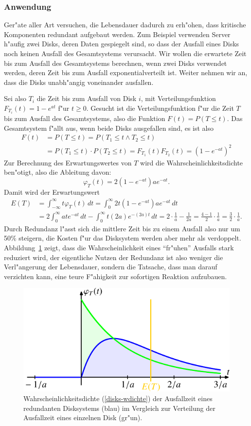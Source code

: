 \subsubsection{Anwendung}
Ger"ate aller Art versuchen, die Lebensdauer dadurch zu erh"ohen, dass
kritische Komponenten redundant aufgebaut werden.
Zum Beispiel verwenden Server h"aufig zwei Disks, deren Daten
gespiegelt sind, so dass der Ausfall eines Disks noch keinen Ausfall
des Gesamtsystems verursacht.
Wir wollen die erwartete Zeit bis zum
Ausfall des Gesamtsystems berechnen, wenn zwei Disks verwendet werden,
deren Zeit bis zum Ausfall exponentialverteilt ist.
Weiter nehmen
wir an, dass die Disks unabh"angig voneinander ausfallen.

Sei also $T_i$ die Zeit bis zum Ausfall von Disk $i$, mit
Verteilungsfunktion $F_{T_i}(t)=1-e^{at}$ f"ur $t\ge 0$.
Gesucht
ist die Verteilungsfunktion f"ur die Zeit $T$ bis zum Ausfall
des Gesamtsystems, also die Funktion $F(t)=P(T\le t)$.
Das Gesamtsystem
f"allt aus, wenn beide Disks ausgefallen sind, es ist also
\begin{align*}
F(t)
&=P(T\le t)=P(T_1\le t\wedge T_2\le t)\\
&=P(T_1\le t)\cdot P(T_2\le t)
= F_{T_1}(t) F_{T_2}(t)=(1-e^{-at})^2
\end{align*}
Zur Berechnung des Erwartungswertes von $T$ wird die
Wahrscheinlichkeitsdichte ben"otigt, also die Ableitung davon:
\begin{equation}
\varphi_{T}(t)=2(1-e^{-at})ae^{-at}.
\label{disks-wdichte}
\end{equation}
Damit wird der Erwartungswert
\begin{align*}
E(T)
&=
\int_{-\infty}^{\infty}t\varphi_T(t)\,dt
=\int_0^\infty 2t(1-e^{-at})ae^{-at}\,dt
\\
&=2\int_0^\infty ate^{-at}\,dt - \int_0^\infty t (2a)e^{-(2a)t}\,dt
=2\cdot\frac1a-\frac1{2a}=\frac{4-1}2\cdot\frac1a=\frac32\cdot\frac1a.
\end{align*}
Durch Redundanz l"asst sich die mittlere Zeit bis zu einem Ausfall
also nur um 50\% steigern, die Kosten f"ur das Disksystem werden
aber mehr als verdoppelt.
Abbildung~\ref{graph:disksystem} zeigt, dass die Wahrscheinlichkeit
eines ``fr"uhen'' Ausfalls stark reduziert wird, der eigentliche
Nutzen der Redundanz ist also weniger die Verl"angerung der 
Lebensdauer, sondern die Tatsache, dass man darauf verzichten kann,
eine teure F"ahigkeit zur sofortigen Reaktion aufzubauen.
\begin{figure}
\centering
\includegraphics{images/exp-3.pdf}
\caption{Wahrscheinlichkeitsdichte (\ref{disks-wdichte}) 
der Ausfallzeit eines redundanten Disksystems (blau)
im Vergleich zur Verteilung der Ausfallzeit eines einzelnen Disk (gr"un).
\label{graph:disksystem}}
\end{figure}

